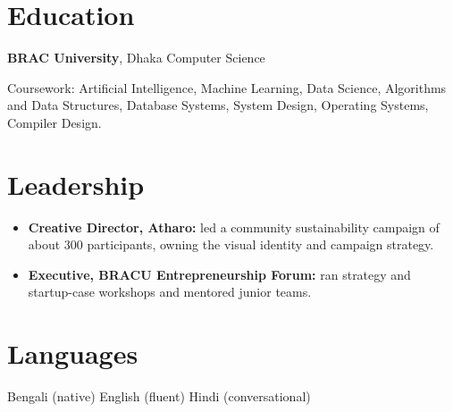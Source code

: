 \documentclass[10pt,a4paper]{article}
\newcommand{\sep}{\unskip\enspace{\color{muted}\textbar}\enspace\ignorespaces}
\begin{document}
\section{Education}
\textbf{BRAC University}, Dhaka \sep Computer Science\par
{\small Coursework: Artificial Intelligence, Machine Learning, Data Science, Algorithms and Data Structures, Database Systems,
System Design, Operating Systems, Compiler Design.}

\section{Leadership}
\begin{itemize}
  \item \textbf{Creative Director, Atharo:} led a community sustainability campaign of about 300 participants, owning the
        visual identity and campaign strategy.
  \item \textbf{Executive, BRACU Entrepreneurship Forum:} ran strategy and startup-case workshops and mentored junior teams.
\end{itemize}

\section{Languages}
Bengali (native) \sep English (fluent) \sep Hindi (conversational)
\end{document}
